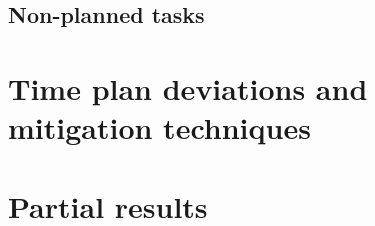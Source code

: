 \documentclass[11pt]{article}
\begin{document}
\subsection{Non-planned tasks}
\label{sec:non_planned_tasks}

\section{Time plan deviations and mitigation techniques}
\label{sec:time_deviations}

\section{Partial results}
\label{sec:partial_results}


\begin{thebibliography}{99}

\end{thebibliography}
\end{document}
